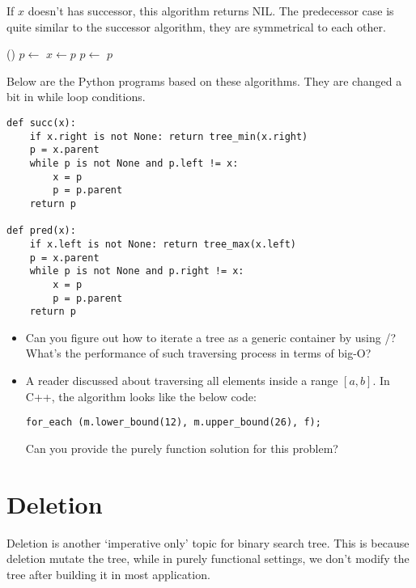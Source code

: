 \documentclass{article}
\begin{document}
If $x$ doesn't has successor, this algorithm returns NIL.
The predecessor case is quite similar to the successor algorithm, they
are symmetrical to each other.

\begin{algorithmic}[1]
    \State \Return {}()
  \Else
    \State $p \gets $ 
      \State $x \gets p$
      \State $p \gets $ 
    \EndWhile
    \State \Return $p$
  \EndIf
\EndFunction
\end{algorithmic}

Below are the Python programs based on these algorithms. They are changed
a bit in while loop conditions.

\lstset{language=Python}
\begin{lstlisting}
def succ(x):
    if x.right is not None: return tree_min(x.right)
    p = x.parent
    while p is not None and p.left != x:
        x = p
        p = p.parent
    return p

def pred(x):
    if x.left is not None: return tree_max(x.left)
    p = x.parent
    while p is not None and p.right != x:
        x = p
        p = p.parent
    return p
\end{lstlisting}

\begin{Exercise}

\begin{itemize}
\item Can you figure out how to iterate a tree as a generic container
by using /? What's the performance of such traversing
process in terms of big-O?

\item A reader discussed about traversing all elements inside a
range $[a, b]$. In C++, the algorithm looks like the below code:

\texttt{for\_each (m.lower\_bound(12), m.upper\_bound(26), f);}

Can you provide the purely function solution for this problem?
\end{itemize}

\end{Exercise}

\section{Deletion}
Deletion is another `imperative only' topic for binary search tree.
This is because deletion mutate the tree, while in purely functional
settings, we don't modify the tree after building it in most
application.
\end{document}
